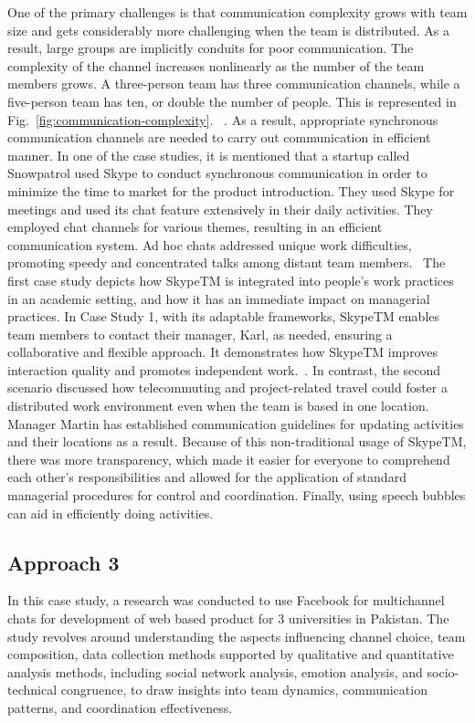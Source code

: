 \documentclass[runningheads]{llncs}
\begin{document}
One of the primary challenges is that communication complexity grows with team size and gets considerably more challenging when the team is distributed. As a result, large groups are implicitly conduits for poor communication. The complexity of the channel increases nonlinearly as the number of the team members grows. A three-person team has three communication channels, while a five-person team has ten, or double the number of people. This is represented in Fig.~\ref{fig:communication-complexity}. ~\cite{refpaper6}. As a result, appropriate synchronous communication channels are needed to carry out communication in efficient manner. In one of the case studies, it is mentioned that a startup called Snowpatrol used Skype to conduct synchronous communication in order to minimize the time to market for the product introduction. They used Skype for meetings and used its chat feature extensively in their daily activities. They employed chat channels for various themes, resulting in an efficient communication system. Ad hoc chats addressed unique work difficulties, promoting speedy and concentrated talks among distant team members.~\cite{refpaper7} The first case study depicts how SkypeTM is integrated into people's work practices in an academic setting, and how it has an immediate impact on managerial practices. In Case Study 1, with its adaptable frameworks, SkypeTM enables team members to contact their manager, Karl, as needed, ensuring a collaborative and flexible approach. It demonstrates how SkypeTM improves interaction quality and promotes independent work.~\cite{refpaper7}. In contrast, the second scenario discussed how telecommuting and project-related travel could foster a distributed work environment even when the team is based in one location.  Manager Martin has established communication guidelines for updating activities and their locations as a result. Because of this non-traditional usage of SkypeTM, there was more transparency, which made it easier for everyone to comprehend each other's responsibilities and allowed for the application of standard managerial procedures for control and coordination. Finally, using speech bubbles can aid in efficiently doing activities.~\cite{refpaper7}

\subsection{Approach 3}
In this case study, a research was conducted to use Facebook for multichannel chats for development of web based product for 3 universities in Pakistan. The study revolves around understanding the aspects  influencing channel choice, team composition, data collection methods supported by qualitative and quantitative analysis methods, including social network analysis, emotion analysis, and socio-technical congruence, to draw insights into team dynamics, communication patterns, and coordination effectiveness. ~\cite{refpaper8}
\end{document}
